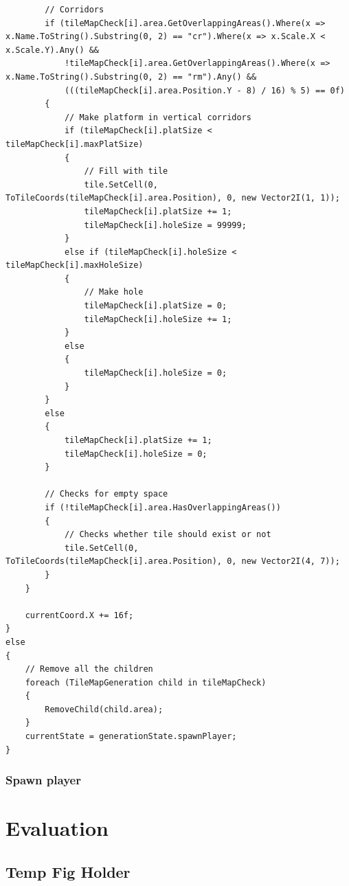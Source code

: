 \documentclass{article}
\begin{document}
\begin{lstlisting}
        // Corridors
        if (tileMapCheck[i].area.GetOverlappingAreas().Where(x => x.Name.ToString().Substring(0, 2) == "cr").Where(x => x.Scale.X < x.Scale.Y).Any() &&
            !tileMapCheck[i].area.GetOverlappingAreas().Where(x => x.Name.ToString().Substring(0, 2) == "rm").Any() &&
            (((tileMapCheck[i].area.Position.Y - 8) / 16) % 5) == 0f)
        {
            // Make platform in vertical corridors
            if (tileMapCheck[i].platSize < tileMapCheck[i].maxPlatSize)
            {
                // Fill with tile
                tile.SetCell(0, ToTileCoords(tileMapCheck[i].area.Position), 0, new Vector2I(1, 1));
                tileMapCheck[i].platSize += 1;
                tileMapCheck[i].holeSize = 99999;
            }
            else if (tileMapCheck[i].holeSize < tileMapCheck[i].maxHoleSize)
            {
                // Make hole
                tileMapCheck[i].platSize = 0;
                tileMapCheck[i].holeSize += 1;
            }
            else
            {
                tileMapCheck[i].holeSize = 0;
            }
        }
        else
        {
            tileMapCheck[i].platSize += 1;
            tileMapCheck[i].holeSize = 0;
        }

        // Checks for empty space
        if (!tileMapCheck[i].area.HasOverlappingAreas())
        {
            // Checks whether tile should exist or not
            tile.SetCell(0, ToTileCoords(tileMapCheck[i].area.Position), 0, new Vector2I(4, 7));
        }
    }

    currentCoord.X += 16f;
}
else
{
    // Remove all the children
    foreach (TileMapGeneration child in tileMapCheck)
    {
        RemoveChild(child.area);
    }
    currentState = generationState.spawnPlayer;
}

\end{lstlisting}

\subsubsection{Spawn player}


\section{Evaluation}

\pagebreak
\subsection{Temp Fig Holder}
\end{document}
